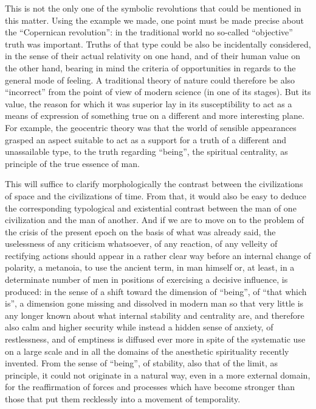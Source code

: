 This is not the only one of the symbolic revolutions that could be mentioned in this matter. Using the example we made, one point must be made precise about the ``Copernican revolution'': in the traditional world no so-called ``objective'' truth was important. Truths of that type could be also be incidentally considered, in the sense of their actual relativity on one hand, and of their human value on the other hand, bearing in mind the criteria of opportunities in regards to the general mode of feeling. A traditional theory of nature could therefore be also ``incorrect'' from the point of view of modern science (in one of its stages). But its value, the reason for which it was superior lay in its susceptibility to act as a means of expression of something true on a different and more interesting plane. For example, the geocentric theory was that the world of sensible appearances grasped an aspect suitable to act as a support for a truth of a different and unassailable type, to the truth regarding ``being'', the spiritual centrality, as principle of the true essence of man.

This will suffice to clarify morphologically the contrast between the civilizations of space and the civilizations of time. From that, it would also be easy to deduce the corresponding typological and existential contrast between the man of one civilization and the man of another. And if we are to move on to the problem of the crisis of the present epoch on the basis of what was already said, the uselessness of any criticism whatsoever, of any reaction, of any velleity of rectifying actions should appear in a rather clear way before an internal change of polarity, a metanoia, to use the ancient term, in man himself or, at least, in a determinate number of men in positions of exercising a decisive influence, is produced: in the sense of a shift toward the dimension of ``being'', of ``that which is'', a dimension gone missing and dissolved in modern man so that very little is any longer known about what internal stability and centrality are, and therefore also calm and higher security while instead a hidden sense of anxiety, of restlessness, and of emptiness is diffused ever more in spite of the systematic use on a large scale and in all the domains of the anesthetic spirituality recently invented. From the sense of ``being'', of stability, also that of the limit, as principle, it could not originate in a natural way, even in a more external domain, for the reaffirmation of forces and processes which have become stronger than those that put them recklessly into a movement of temporality.

